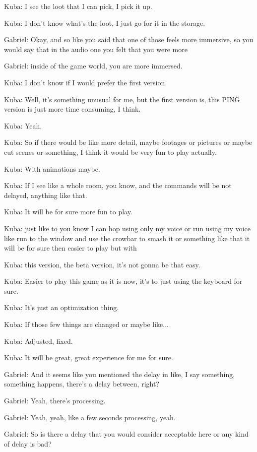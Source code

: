 Kuba: I see the loot that I can pick, I pick it up.

Kuba: I don't know what's the loot, I just go for it in the storage.

Gabriel: Okay, and so like you said that one of those feels more immersive, so you would say that in the audio one you felt that you were more

Gabriel: inside of the game world, you are more immersed.

Kuba: I don't know if I would prefer the first version.

Kuba: Well, it's something unusual for me, but the first version is, this PING version is just more time consuming, I think.

Kuba: Yeah.

Kuba: So if there would be like more detail, maybe footages or pictures or maybe cut scenes or something, I think it would be very fun to play actually.

Kuba: With animations maybe.

Kuba: If I see like a whole room, you know, and the commands will be not delayed, anything like that.

Kuba: It will be for sure more fun to play.

Kuba: just like to you know I can hop using only my voice or run using my voice like run to the window and use the crowbar to smash it or something like that it will be for sure then easier to play but with

Kuba: this version, the beta version, it's not gonna be that easy.

Kuba: Easier to play this game as it is now, it's to just using the keyboard for sure.

Kuba: It's just an optimization thing.

Kuba: If those few things are changed or maybe like...

Kuba: Adjusted, fixed.

Kuba: It will be great, great experience for me for sure.

Gabriel: And it seems like you mentioned the delay in like, I say something, something happens, there's a delay between, right?

Gabriel: Yeah, there's processing.

Gabriel: Yeah, yeah, like a few seconds processing, yeah.

Gabriel: So is there a delay that you would consider acceptable here or any kind of delay is bad?

